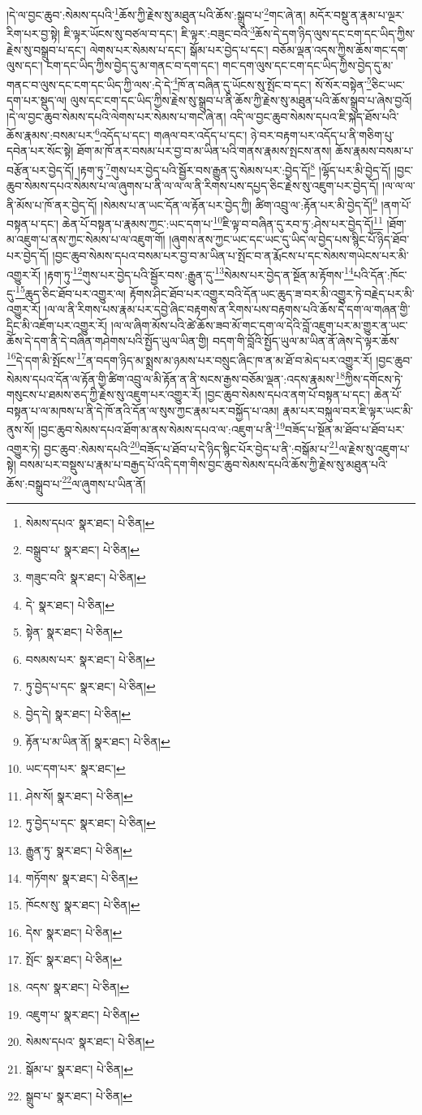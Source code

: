 །དེ་ལ་བྱང་ཆུབ་:སེམས་དཔའི་\footnote{སེམས་དཔའ་  སྣར་ཐང་།  པེ་ཅིན། }ཆོས་ཀྱི་རྗེས་སུ་མཐུན་པའི་ཆོས་:སྒྲུབ་པ་\footnote{བསྒྲུབ་པ་  སྣར་ཐང་།  པེ་ཅིན། }གང་ཞེ་ན། མདོར་བསྡུ་ན་རྣམ་པ་ལྔར་རིག་པར་བྱ་སྟེ། ཇི་ལྟར་ཡོངས་སུ་བཙལ་བ་དང་། ཇི་ལྟར་:བཟུང་བའི་\footnote{གཟུང་བའི་  སྣར་ཐང་།  པེ་ཅིན། }ཆོས་དེ་དག་ཉིད་ལུས་དང་ངག་དང་ཡིད་ཀྱིས་རྗེས་སུ་བསྒྲུབ་པ་དང་། ལེགས་པར་སེམས་པ་དང་། སྒོམ་པར་བྱེད་པ་དང་། བཅོམ་ལྡན་འདས་ཀྱིས་ཆོས་གང་དག་ལུས་དང་། ངག་དང་ཡིད་ཀྱིས་བྱེད་དུ་མ་གནང་བ་དག་དང་། གང་དག་ལུས་དང་ངག་དང་ཡིད་ཀྱིས་བྱེད་དུ་མ་གནང་བ་ལུས་དང་ངག་དང་ཡིད་ཀྱི་ལས་:དེ་དེ་\footnote{དེ་  སྣར་ཐང་།  པེ་ཅིན། }ཁོ་ན་བཞིན་དུ་ཡོངས་སུ་སྤོང་བ་དང་། སོ་སོར་བསྟེན་\footnote{སྟེན་  སྣར་ཐང་།  པེ་ཅིན། }ཅིང་ཡང་དག་པར་སྡུད་ལ། ལུས་དང་ངག་དང་ཡིད་ཀྱིས་རྗེས་སུ་སྒྲུབ་པ་ནི་ཆོས་ཀྱི་རྗེས་སུ་མཐུན་པའི་ཆོས་སྒྲུབ་པ་ཞེས་བྱའོ། །དེ་ལ་བྱང་ཆུབ་སེམས་དཔའི་ལེགས་པར་སེམས་པ་གང་ཞེ་ན། འདི་ལ་བྱང་ཆུབ་སེམས་དཔའ་ཇི་སྐད་ཐོས་པའི་ཆོས་རྣམས་:བསམ་པར་\footnote{བསམས་པར་  སྣར་ཐང་།  པེ་ཅིན། }འདོད་པ་དང་། གཞལ་བར་འདོད་པ་དང་། ཉེ་བར་བརྟག་པར་འདོད་པ་ནི་གཅིག་པུ་དབེན་པར་སོང་སྟེ། ཐོག་མ་ཁོ་ནར་བསམ་པར་བྱ་བ་མ་ཡིན་པའི་གནས་རྣམས་སྤངས་ནས། ཆོས་རྣམས་བསམ་པ་བརྩོན་པར་བྱེད་དོ། །རྟག་ཏུ་\footnote{ཏུ་བྱེད་པ་དང་  སྣར་ཐང་།  པེ་ཅིན། }གུས་པར་བྱེད་པའི་སྦྱོར་བས་རྒྱུན་དུ་སེམས་པར་:བྱེད་དོ།\footnote{བྱེད་དེ།  སྣར་ཐང་།  པེ་ཅིན། } །ལྷོད་པར་མི་བྱེད་དོ། །བྱང་ཆུབ་སེམས་དཔའ་སེམས་པ་ལ་ཞུགས་པ་ནི་ལ་ལ་ལ་ནི་རིགས་པས་དཔྱད་ཅིང་རྗེས་སུ་འཇུག་པར་བྱེད་དོ། །ལ་ལ་ལ་ནི་མོས་པ་ཁོ་ནར་བྱེད་དོ། །སེམས་པ་ན་ཡང་དོན་ལ་རྟོན་པར་བྱེད་ཀྱི། ཚིག་འབྲུ་ལ་:རྟོན་པར་མི་བྱེད་དོ།\footnote{རྟོན་པ་མ་ཡིན་ནོ།  སྣར་ཐང་།  པེ་ཅིན། } །ནག་པོ་བསྟན་པ་དང་། ཆེན་པོ་བསྟན་པ་རྣམས་ཀྱང་:ཡང་དག་པ་\footnote{ཡང་དག་པར་  སྣར་ཐང་། }ཇི་ལྟ་བ་བཞིན་དུ་རབ་ཏུ་:ཤེས་པར་བྱེད་དོ།\footnote{ཤེས་སོ།  སྣར་ཐང་།  པེ་ཅིན། } །ཐོག་མ་འཇུག་པ་ནས་ཀྱང་སེམས་པ་ལ་འཇུག་གོ། །ཞུགས་ནས་ཀྱང་ཡང་དང་ཡང་དུ་ཡིད་ལ་བྱེད་པས་སྙིང་པོ་ཉིད་ཐོབ་པར་བྱེད་དོ། །བྱང་ཆུབ་སེམས་དཔའ་བསམ་པར་བྱ་བ་མ་ཡིན་པ་སྤོང་བ་ན་རྨོངས་པ་དང་སེམས་གཡེངས་པར་མི་འགྱུར་རོ། །རྟག་ཏུ་\footnote{ཏུ་བྱེད་པ་དང་  སྣར་ཐང་།  པེ་ཅིན། }གུས་པར་བྱེད་པའི་སྦྱོར་བས་:རྒྱུན་དུ་\footnote{རྒྱུན་ཏུ་  སྣར་ཐང་།  པེ་ཅིན། }སེམས་པར་བྱེད་ན་སྔོན་མ་རྟོགས་\footnote{གཏོགས་  སྣར་ཐང་།  པེ་ཅིན། }པའི་དོན་:ཁོང་དུ་\footnote{ཁོངས་སུ་  སྣར་ཐང་།  པེ་ཅིན། }ཆུད་ཅིང་ཐོབ་པར་འགྱུར་ལ། རྟོགས་ཤིང་ཐོབ་པར་འགྱུར་བའི་དོན་ཡང་ཆུད་ཟ་བར་མི་འགྱུར་ཏེ་བརྗེད་པར་མི་འགྱུར་རོ། །ལ་ལ་ནི་རིགས་པས་རྣམ་པར་དབྱེ་ཞིང་བརྟགས་ན་རིགས་པས་བརྟགས་པའི་ཆོས་དེ་དག་ལ་གཞན་གྱི་དྲིང་མི་འཇོག་པར་འགྱུར་རོ། །ལ་ལ་ཞིག་མོས་པའི་ཚེ་ཆོས་ཟབ་མོ་གང་དག་ལ་དེའི་བློ་འཇུག་པར་མ་གྱུར་ན་ཡང་ཆོས་དེ་དག་ནི་དེ་བཞིན་གཤེགས་པའི་སྤྱོད་ཡུལ་ཡིན་གྱི། བདག་གི་བློའི་སྤྱོད་ཡུལ་མ་ཡིན་ནོ་ཞེས་དེ་ལྟར་ཆོས་\footnote{དེས་  སྣར་ཐང་།  པེ་ཅིན། }དེ་དག་མི་སྤོངས་\footnote{སྤོང་  སྣར་ཐང་།  པེ་ཅིན། }ན་བདག་ཉིད་མ་སྨྲས་མ་ཉམས་པར་བསྲུང་ཞིང་ཁ་ན་མ་ཐོ་བ་མེད་པར་འགྱུར་རོ། །བྱང་ཆུབ་སེམས་དཔའ་དོན་ལ་རྟོན་གྱི་ཚིག་འབྲུ་ལ་མི་རྟོན་ན་ནི་སངས་རྒྱས་བཅོམ་ལྡན་:འདས་རྣམས་\footnote{འདས་  སྣར་ཐང་།  པེ་ཅིན། }ཀྱིས་དགོངས་ཏེ་གསུངས་པ་ཐམས་ཅད་ཀྱི་རྗེས་སུ་འཇུག་པར་འགྱུར་རོ། །བྱང་ཆུབ་སེམས་དཔའ་ནག་པོ་བསྟན་པ་དང་། ཆེན་པོ་བསྟན་པ་ལ་མཁས་པ་ནི་དེ་ཁོ་ནའི་དོན་ལ་སུས་ཀྱང་རྣམ་པར་བསྐྱོད་པ་འམ། རྣམ་པར་བསྐུལ་བར་ཇི་ལྟར་ཡང་མི་ནུས་སོ། །བྱང་ཆུབ་སེམས་དཔའ་ཐོག་མ་ནས་སེམས་དཔའ་ལ་:འཇུག་པ་ནི་\footnote{འཇུག་པ་  སྣར་ཐང་།  པེ་ཅིན། }བཟོད་པ་སྔོན་མ་ཐོབ་པ་ཐོབ་པར་འགྱུར་ཏེ། བྱང་ཆུབ་:སེམས་དཔའི་\footnote{སེམས་དཔའ་  སྣར་ཐང་།  པེ་ཅིན། }བཟོད་པ་ཐོབ་པ་དེ་ཉིད་སྙིང་པོར་བྱེད་པ་ནི་:བསྒོམ་པ་\footnote{སྒོམ་པ་  སྣར་ཐང་།  པེ་ཅིན། }ལ་རྗེས་སུ་འཇུག་པ་སྟེ། བསམ་པར་བསྡུས་པ་རྣམ་པ་བརྒྱད་པོ་འདི་དག་གིས་བྱང་ཆུབ་སེམས་དཔའི་ཆོས་ཀྱི་རྗེས་སུ་མཐུན་པའི་ཆོས་:བསྒྲུབ་པ་\footnote{སྒྲུབ་པ་  སྣར་ཐང་།  པེ་ཅིན། }ལ་ཞུགས་པ་ཡིན་ནོ། 
